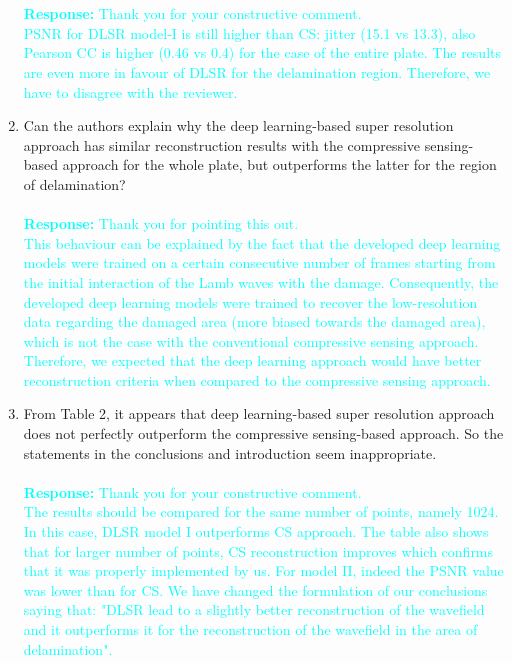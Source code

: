 \documentclass[11pt,a2paper]{report}
\begin{document}
\begin{enumerate}
		\\ \\ 
		\textcolor{Cyan}
		{
			\textbf{Response:}
			Thank you for your constructive comment.\\
			PSNR for DLSR model-I is still higher than CS: jitter (15.1 vs 13.3), also Pearson CC is higher (0.46 vs 0.4) for the case of the entire plate. 
			The results are even more in favour of DLSR for the delamination region. 
			Therefore, we have to disagree with the reviewer.
		}
		\item  Can the authors explain why the deep learning-based super resolution approach has similar reconstruction results with the compressive sensing-based approach for the whole plate, but outperforms the latter for the region of delamination?
		\\ \\ 
		\textcolor{Cyan}
		{
			\textbf{Response:}
			Thank you for pointing this out. \\
			This behaviour can be explained by the fact that the developed deep learning models were trained on a certain consecutive number of frames starting from the initial interaction of the Lamb waves with the damage. 
			Consequently, the developed deep learning models were trained to recover the low-resolution data regarding the damaged area (more biased towards the damaged area), which is not the case with the conventional compressive sensing approach.
			Therefore, we expected that the deep learning approach would have better reconstruction criteria when compared to the compressive sensing approach.	
		}
		\item From Table 2, it appears that deep learning-based super resolution approach does not perfectly outperform the compressive sensing-based approach. 
		So the statements in the conclusions and introduction seem inappropriate.
		\\ \\ 
		\textcolor{Cyan}
		{
			\textbf{Response:}
			Thank you for your constructive comment. \\
			The results should be compared for the same number of points, namely 1024. 
			In this case, DLSR model I outperforms CS approach. 
			The table also shows that for larger number of points, CS reconstruction improves which confirms that it was properly implemented by us.
			For model II, indeed the PSNR value was lower than for CS. 
			We have changed the formulation of our conclusions saying that: "DLSR lead to a slightly better reconstruction of the wavefield and it outperforms it for the reconstruction of the wavefield in the area of delamination".
}
\end{enumerate}
\end{document}
